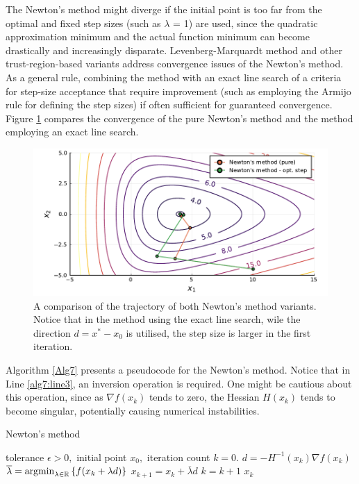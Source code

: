 The Newton's method might diverge if the initial point is too far from the optimal and fixed step sizes (such as $\lambda$ = 1) are used, since the quadratic approximation minimum and the actual function minimum can become drastically and increasingly disparate. Levenberg-Marquardt method and other trust-region-based variants address convergence issues of the Newton's method. As a general rule, combining the method with an exact line search of a criteria for step-size acceptance that require improvement (such as employing the Armijo rule for defining the step sizes) if often sufficient for guaranteed convergence. Figure \ref{fig:newton_method_comp} compares the convergence of the pure Newton's method and the method employing an exact line search.

\begin{figure}[H]
	\includegraphics[width=\textwidth]{part_2/chapter_5/figures/newton_path6.pdf}
	\caption{A comparison of the trajectory of both Newton's method variants. Notice that in the method using the exact line search, wile the direction $d = x^* - x_0$ is utilised, the step size is larger in the first iteration.} \label{fig:newton_method_comp}
\end{figure}
%


Algorithm \ref{Alg7} presents a pseudocode for the Newton's method. Notice that in Line \ref{alg7:line3}, an inversion operation is required. One might be cautious about this operation, since as $\nabla f(x_k)$ tends to zero, the Hessian $H(x_k)$ tends to become singular, potentially causing numerical instabilities.

\begin{algorithm}[H]
\caption{Newton's method} \label{Alg7}
\begin{algorithmic}[1] %
 tolerance $\epsilon > 0,$ initial point $x_0,$ iteration count $k = 0$. 
        \State $d = -H^{-1}(x_k) \nabla f(x_k)$ \label{alg7:line3}
        \State $\overline{\lambda} = \mathop{\rm argmin}_{\lambda \in \mathbb{R}}\left\{ f(x_k + \lambda d) \right \}$
        \State $x_{k+1} = x_k + \overline{\lambda}  d$
    \State $k = k+1$    
\EndWhile
{} $x_k$
\end{algorithmic}
\end{algorithm}
 
